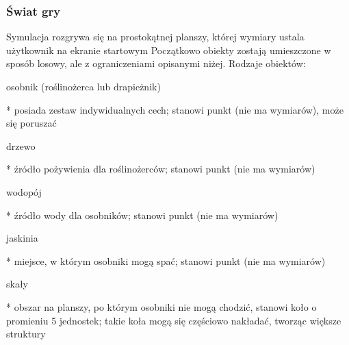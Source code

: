 \subsubsection*{Świat gry}

Symulacja rozgrywa się na prostokątnej planszy, której wymiary ustala użytkownik na ekranie startowym Początkowo obiekty zostają umieszczone w sposób losowy, ale z ograniczeniami opisanymi niżej. Rodzaje obiektów\-:


\begin{DoxyItemize}
\item osobnik (roślinożerca lub drapieżnik) \begin{DoxyVerb}  * posiada zestaw indywidualnych cech; stanowi punkt (nie ma wymiarów), może się poruszać
\end{DoxyVerb}

\end{DoxyItemize}


\begin{DoxyItemize}
\item drzewo \begin{DoxyVerb}  * źródło pożywienia dla roślinożerców; stanowi punkt (nie ma wymiarów) 
\end{DoxyVerb}

\end{DoxyItemize}


\begin{DoxyItemize}
\item wodopój \begin{DoxyVerb}  * źródło wody dla osobników; stanowi punkt (nie ma wymiarów) 
\end{DoxyVerb}

\end{DoxyItemize}


\begin{DoxyItemize}
\item jaskinia \begin{DoxyVerb}  * miejsce, w którym osobniki mogą spać; stanowi punkt (nie ma wymiarów) 
\end{DoxyVerb}

\end{DoxyItemize}


\begin{DoxyItemize}
\item skały \begin{DoxyVerb}  * obszar na planszy, po którym osobniki nie mogą chodzić, stanowi koło o promieniu 5 jednostek; takie koła mogą się częściowo nakładać, tworząc większe struktury
\end{DoxyVerb}

\end{DoxyItemize}

